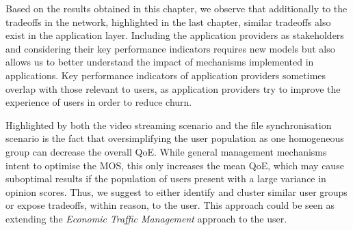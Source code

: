 Based on the results obtained in this chapter, we observe that additionally to the tradeoffs in the network, highlighted in the last chapter, similar tradeoffs also exist in the application layer.
Including the application providers as stakeholders and considering their key performance indicators requires new models but also allows us to better understand the impact of mechanisms implemented in applications.
Key performance indicators of application providers sometimes overlap with those relevant to users, as application providers try to improve the experience of users in order to reduce churn.

Highlighted by both the video streaming scenario and the file synchronisation scenario is the fact that oversimplifying the user population as one homogeneous group can decrease the overall \gls{QoE}.
While general  management mechanisms intent to optimise the \gls{MOS}, this only increases the mean \gls{QoE}, which may cause suboptimal results if the population of users present with a large variance in opinion scores.
Thus, we suggest to either identify and cluster similar user groups or expose tradeoffs, within reason, to the user.
This approach could be seen as extending the \emph{Economic Traffic Management} approach to the user.